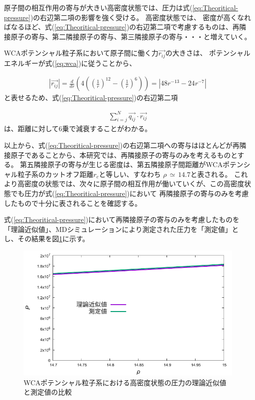 \documentclass[titlepage]{jsreport}
\begin{document}
{{{原子間の相互作用の寄与が大きい高密度状態では、圧力は式(\ref{eq:Theoritical-pressure})の右辺第二項の影響を強く受ける。
高密度状態では、
密度が高くなればなるほど、式(\ref{eq:Theoritical-pressure})の右辺第二項で考慮するものは、再隣接原子の寄与、第二隣接原子の寄与、第三隣接原子の寄与・・・と増えていく。

WCAポテンシャル粒子系において原子間に働く力$\vec{r_{ij}}$の大きさは、
ポテンシャルエネルギーが式(\ref{eq:wca})に従うことから、

\large
\begin{eqnarray}
    | {\vec{r_{ij}}} |=\frac{d}{dr}\left(4\left(\left(\frac{1}{r}\right)^{12}-\left(\frac{1}{r}\right)^6\right)\right)=| 48r^{-13}-24r^{-7}| \nonumber
\end{eqnarray}
\normalsize
と表せるため、式(\ref{eq:Theoritical-pressure})の右辺第二項

\large
\begin{eqnarray}
    \sum_{i=j}^N\vec{q_{ij}} \cdot \vec{r_{ij}} \nonumber
\end{eqnarray}
\normalsize
は、距離に対して6乗で減衰することがわかる。

以上から、式(\ref{eq:Theoritical-pressure})の右辺第二項への寄与はほとんどが再隣接原子であることから、本研究では、再隣接原子の寄与のみを考えるものとする。
第五隣接原子の寄与が生じる密度は、第五隣接原子間距離がWCAポテンシャル粒子系のカットオフ距離$r_c$と等しい、すなわち
$\rho\,{\simeq}\,14.7$と表される。
これより高密度の状態では、次々に原子間の相互作用が働いていくが、この高密度状態でも圧力が式(\ref{eq:Theoritical-pressure})において
再隣接原子の寄与のみを考慮したもので十分に表されることを確認する。

式(\ref{eq:Theoritical-pressure})において再隣接原子の寄与のみを考慮したものを「理論近似値」、MDシミュレーションにより測定された圧力を「測定値」とし、その結果を図\ref{fig:highden_compare:den-pre}に示す。

\begin{figure}[htbp]
    \begin{center}
        \includegraphics[width=14cm]{fig/highden_compare:den-pre.pdf}
    \end{center}
    \caption{WCAポテンシャル粒子系における高密度状態の圧力の理論近似値と測定値の比較}
    \label{fig:highden_compare:den-pre}
\end{figure}

}}}
\end{document}
